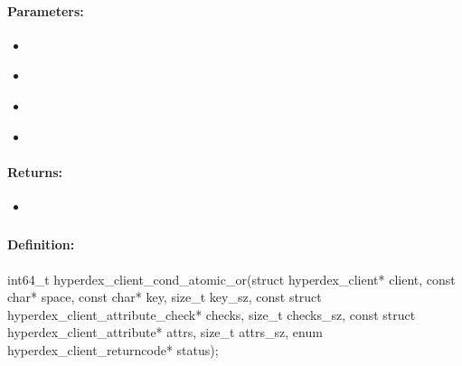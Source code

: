 \paragraph{Parameters:}
\begin{itemize}[noitemsep]
\item {}\\

\item {}\\

\item {}\\

\item {}\\

\end{itemize}

\paragraph{Returns:}
\begin{itemize}[noitemsep]
\item {}\\

\end{itemize}

\pagebreak
\subsubsection{}
\label{api:c:cond_atomic_or}


\paragraph{Definition:}
\begin{ccode}
int64_t hyperdex_client_cond_atomic_or(struct hyperdex_client* client,
        const char* space,
        const char* key, size_t key_sz,
        const struct hyperdex_client_attribute_check* checks, size_t checks_sz,
        const struct hyperdex_client_attribute* attrs, size_t attrs_sz,
        enum hyperdex_client_returncode* status);
\end{ccode}


